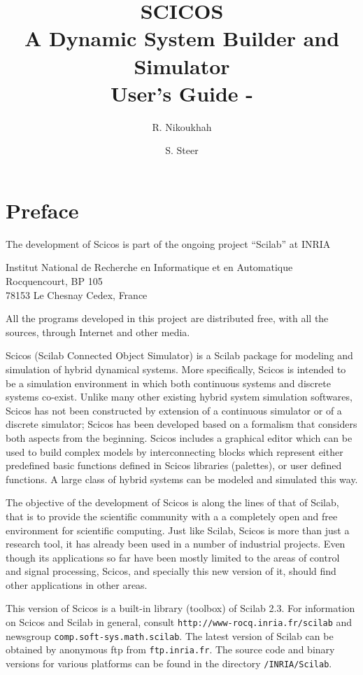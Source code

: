 \documentclass{book}
\title{SCICOS\\[.1cm]
{A Dynamic System Builder and Simulator}\\[.4cm]
User's Guide - \version}
\author{R. Nikoukhah \and S. Steer}
\date{
}
\newcommand{\ver}{2.3}
\begin{document}
\maketitle

\chapter*{Preface}
The development of Scicos is part of the ongoing project ``Scilab'' at
INRIA 

\begin{center}
Institut National de Recherche en Informatique et en Automatique \\
Rocquencourt, BP 105 \\
78153 Le Chesnay Cedex, France
\end{center}

All the programs developed in this project are distributed free, with all
the sources, through Internet and other media.

\bigskip

Scicos (Scilab Connected Object Simulator) is a Scilab package for
modeling and simulation of hybrid dynamical systems. 
More specifically, Scicos is intended to be a simulation environment in which 
both continuous systems and discrete systems co-exist. Unlike many
other existing hybrid system simulation softwares, Scicos has not
been constructed by extension of a continuous simulator or of a
discrete simulator; Scicos has been developed based on a formalism
that considers both aspects from the beginning. 
Scicos includes a graphical editor which can be used to build complex
models by interconnecting blocks which represent either predefined basic
functions defined in Scicos libraries (palettes), or user defined
functions. A large class of hybrid systems can be modeled and
simulated this way.

\bigskip 

The objective of the development of Scicos is along the lines of that
of Scilab, that is to provide the scientific community with a
a completely open and free environment for scientific computing. 
Just like Scilab, Scicos is more than just a research tool, it has
already been used in a number of
industrial projects. Even though its applications so far have been
mostly limited to the areas of control and signal processing, Scicos, and
specially this new version of it, should find other applications in other areas.

\bigskip 


This version of Scicos is a built-in library (toolbox) of Scilab \ver. 
For information on Scicos and Scilab in
general, consult {\tt http://www-rocq.inria.fr/scilab} and newsgroup 
{\tt comp.soft-sys.math.scilab}. The latest version of Scilab can be
obtained by anonymous ftp from {\tt ftp.inria.fr}. The source code
and binary versions for various platforms can be found in the directory
{\tt /INRIA/Scilab}.
\end{document}
